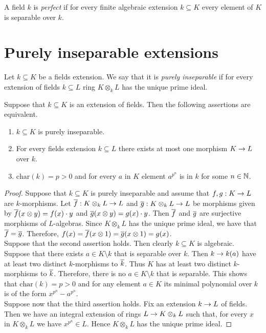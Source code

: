 \begin{definition}
A field $k$ is \textit{perfect} if for every finite algebraic extension $k\subseteq K$ every element of $K$ is separable over $k$.
\end{definition}

\section{Purely inseparable extensions}
\begin{definition}
Let $k\subseteq K$ be a fields extension. We say that it is \textit{purely inseparable} if for every extension of fields $k\subseteq L$ ring $K\otimes_kL$ has the unique prime ideal.
\end{definition}

\begin{proposition}\label{proposition:characterization_of_purely_inseparable_extensions}
Suppose that $k\subseteq K$ is an extension of fields. Then the following assertions are equivalent.
\begin{enumerate}[label=\emph{\textbf{(\roman*)}}, leftmargin=3.0em]
\item $k\subseteq K$ is purely inseparable.
\item For every fields extension $k\subseteq L$ there exists at most one morphism $K\rightarrow L$ over $k$.
\item $\mathrm{char}(k)=p>0$ and for every $a$ in $K$ element $a^{p^n}$ is in $k$ for some $n\in {\mathbb N}$. 
\end{enumerate}
\end{proposition}
\begin{proof}
Suppose that $k\subseteq K$ is purely inseparable and assume that $f,g:K\rightarrow L$ are $k$-morphisms. Let $\overline{f}:K\otimes_kL\rightarrow L$ and $\overline{g}:K\otimes_kL\rightarrow L$ be morphisms given by $\overline{f}(x\otimes y)=f(x)\cdot y$ and $\overline{g}(x\otimes y)=g(x)\cdot y$. Then $\overline{f}$ and $\overline{g}$ are surjective morphisms of $L$-algebras. Since $K\otimes_kL$ has the unique prime ideal, we have that $\overline{f}=\overline{g}$. Therefore, $f(x)=\overline{f}(x\otimes 1)=\overline{g}(x\otimes 1)=g(x)$.\\
Suppose that the second assertion holds. Then clearly $k\subseteq K$ is algebraic. Suppose that there exists $a\in K\setminus k$ that is separable over $k$. Then $k\rightarrow k(a)$ have at least two distinct $k$-morphisms to $\overline{k}$. Thus $K$ has at least two distinct $k$-morphisms to $\overline{k}$. Therefore, there is no $a\in K\setminus k$ that is separable. This shows that $\mathrm{char}(k)=p>0$ and for any element $a\in K$ its minimal polynomial over $k$ is of the form $x^{p^n}-a^{p^n}$.\\
Suppose now that the third assertion holds. Fix an extension $k\rightarrow L$ of fields. Then we have an integral extension of rings $L\rightarrow K\otimes_kL$ such that, for every $x$ in $K\otimes_kL$ we have $x^{p^{n}}\in L$. Hence $K\otimes_kL$ has the unique prime ideal.
\end{proof}


